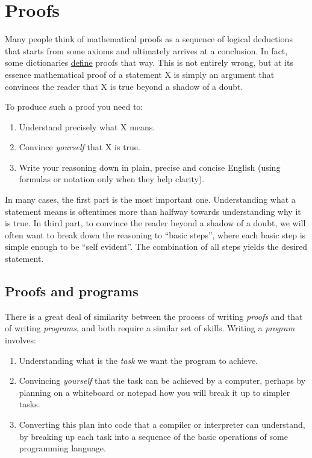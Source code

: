 \section{Proofs}\label{proofsbackgroundsec}

Many people think of mathematical proofs as a sequence of logical
deductions that starts from some axioms and ultimately arrives at a
conclusion. In fact, some dictionaries
\href{http://www.thefreedictionary.com/mathematical+proof}{define}
proofs that way. This is not entirely wrong, but at its essence
mathematical proof of a statement X is simply an argument that convinces
the reader that X is true beyond a shadow of a doubt.

To produce such a proof you need to:

\begin{enumerate}
\def\labelenumi{\arabic{enumi}.}
\item
  Understand precisely what X means.
\item
  Convince \emph{yourself} that X is true.
\item
  Write your reasoning down in plain, precise and concise English (using
  formulas or notation only when they help clarity).
\end{enumerate}

In many cases, the first part is the most important one. Understanding
what a statement means is oftentimes more than halfway towards
understanding why it is true. In third part, to convince the reader
beyond a shadow of a doubt, we will often want to break down the
reasoning to ``basic steps'', where each basic step is simple enough to
be ``self evident''. The combination of all steps yields the desired
statement.

\subsection{Proofs and programs}\label{Proofs-and-programs}

There is a great deal of similarity between the process of writing
\emph{proofs} and that of writing \emph{programs}, and both require a
similar set of skills. Writing a \emph{program} involves:

\begin{enumerate}
\def\labelenumi{\arabic{enumi}.}
\item
  Understanding what is the \emph{task} we want the program to achieve.
\item
  Convincing \emph{yourself} that the task can be achieved by a
  computer, perhaps by planning on a whiteboard or notepad how you will
  break it up to simpler tasks.
\item
  Converting this plan into code that a compiler or interpreter can
  understand, by breaking up each task into a sequence of the basic
  operations of some programming language.
\end{enumerate}

